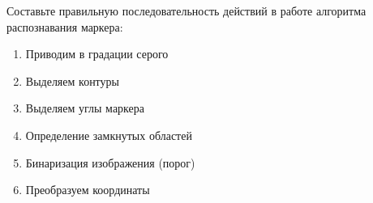
Составьте правильную последовательность действий в работе алгоритма распознавания маркера:

\begin{enumerate}
    \item Приводим в градации серого
    \item Выделяем контуры
    \item Выделяем углы маркера
    \item Определение замкнутых областей
    \item Бинаризация изображения (порог)
    \item Преобразуем координаты
\end{enumerate}